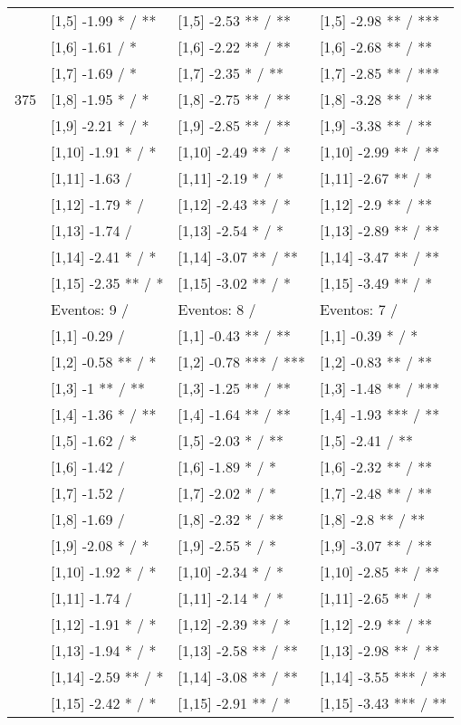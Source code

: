 \begin{table}
\begin{tabular}[t]{llll}
 & {}[1,5] -1.99 * / ** & {}[1,5] -2.53 ** / ** & {}[1,5] -2.98 ** / ***\\
 & {}[1,6] -1.61  / * & {}[1,6] -2.22 ** / ** & {}[1,6] -2.68 ** / **\\
 & {}[1,7] -1.69  / * & {}[1,7] -2.35 * / ** & {}[1,7] -2.85 ** / ***\\
375 & {}[1,8] -1.95 * / * & {}[1,8] -2.75 ** / ** & {}[1,8] -3.28 ** / **\\
\addlinespace
 & {}[1,9] -2.21 * / * & {}[1,9] -2.85 ** / ** & {}[1,9] -3.38 ** / **\\
 & {}[1,10] -1.91 * / * & {}[1,10] -2.49 ** / * & {}[1,10] -2.99 ** / **\\
 & {}[1,11] -1.63  / & {}[1,11] -2.19 * / * & {}[1,11] -2.67 ** / *\\
 & {}[1,12] -1.79 * / & {}[1,12] -2.43 ** / * & {}[1,12] -2.9 ** / **\\
 & {}[1,13] -1.74  / & {}[1,13] -2.54 * / * & {}[1,13] -2.89 ** / **\\
\addlinespace
 & {}[1,14] -2.41 * / * & {}[1,14] -3.07 ** / ** & {}[1,14] -3.47 ** / **\\
 & {}[1,15] -2.35 ** / * & {}[1,15] -3.02 ** / * & {}[1,15] -3.49 ** / *\\
 & Eventos:  9 / & Eventos:  8 / & Eventos:  7 /\\
 & {}[1,1] -0.29  / & {}[1,1] -0.43 ** / ** & {}[1,1] -0.39 * / *\\
 & {}[1,2] -0.58 ** / * & {}[1,2] -0.78 *** / *** & {}[1,2] -0.83 ** / **\\
\addlinespace
 & {}[1,3] -1 ** / ** & {}[1,3] -1.25 ** / ** & {}[1,3] -1.48 ** / ***\\
 & {}[1,4] -1.36 * / ** & {}[1,4] -1.64 ** / ** & {}[1,4] -1.93 *** / **\\
 & {}[1,5] -1.62  / * & {}[1,5] -2.03 * / ** & {}[1,5] -2.41  / **\\
 & {}[1,6] -1.42  / & {}[1,6] -1.89 * / * & {}[1,6] -2.32 ** / **\\
 & {}[1,7] -1.52  / & {}[1,7] -2.02 * / * & {}[1,7] -2.48 ** / **\\
\addlinespace
500 & {}[1,8] -1.69  / & {}[1,8] -2.32 * / ** & {}[1,8] -2.8 ** / **\\
 & {}[1,9] -2.08 * / * & {}[1,9] -2.55 * / * & {}[1,9] -3.07 ** / **\\
 & {}[1,10] -1.92 * / * & {}[1,10] -2.34 * / * & {}[1,10] -2.85 ** / **\\
 & {}[1,11] -1.74  / & {}[1,11] -2.14 * / * & {}[1,11] -2.65 ** / *\\
 & {}[1,12] -1.91 * / * & {}[1,12] -2.39 ** / * & {}[1,12] -2.9 ** / **\\
\addlinespace
 & {}[1,13] -1.94 * / * & {}[1,13] -2.58 ** / ** & {}[1,13] -2.98 ** / **\\
 & {}[1,14] -2.59 ** / * & {}[1,14] -3.08 ** / ** & {}[1,14] -3.55 *** / **\\
 & {}[1,15] -2.42 * / * & {}[1,15] -2.91 ** / * & {}[1,15] -3.43 *** / **\\
\bottomrule
\end{tabular}
\end{table}
